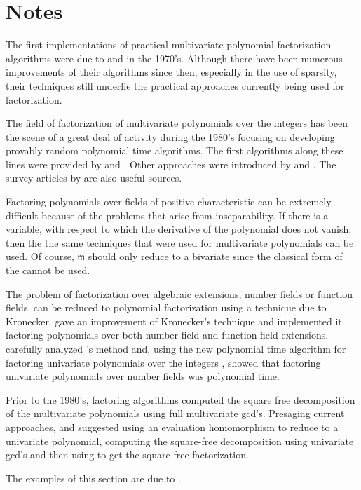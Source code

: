 \section*{Notes}

\small

The first implementations of practical multivariate polynomial
factorization algorithms were due to {\WangP} and {\Rothschild}
\cite{Wang75,Wang76a,Wang78} in the 1970's.  Although there have been
numerous improvements of their algorithms since then, especially in
the use of sparsity, their techniques still underlie the practical
approaches currently being used for factorization.

The field of factorization of multivariate polynomials over the
integers has been the scene of a great deal of activity during the
1980's focusing on developing provably random polynomial time
algorithms.  The first algorithms along these lines were provided by
{\Chistov} and {\Grigoriev} \cite{Chistov82,Chistov87}.  Other
approaches were introduced by {\Gathen} and {\Kaltofen}
\cite{Gathen83b,Gathen85a,Kaltofen85b,Kaltofen85a,Kaltofen85e,Kaltofen90a}. 
The survey articles by {\Kaltofen}
\cite{Kaltofen82c,Kaltofen90b,Kaltofen92a} are also useful
sources. 

Factoring polynomials over fields of positive characteristic can be
extremely difficult because of the problems that arise from
inseparability.  If there is a variable, with respect to which the
derivative of the polynomial does not vanish, then the the same
techniques that were used for multivariate polynomials can be used.
Of course, $\mathfrak{m}$ should only reduce to a bivariate since the
classical form of the  cannot be
used. 

The problem of factorization over algebraic extensions, number fields
or function fields, can be reduced to polynomial factorization using a
technique due to Kronecker.  {\Trager} \cite{Trager76a} gave an
improvement of Kronecker's technique and implemented it factoring
polynomials over both number field and function field extensions.
{\LandauS} \cite{Landau85a} carefully analyzed {\Trager}'s method and,
using the new polynomial time algorithm for factoring univariate
polynomials over the integers \cite{LenstraAK82}, showed that
factoring univariate polynomials over number fields was polynomial
time.

Prior to the 1980's, factoring algorithms computed the square free
decomposition of the multivariate polynomials using full multivariate
{\sc gcd}'s.  Presaging current approaches, {\Trager} and {\WangP}
\cite{Trager79} suggested using an evaluation homomorphism to reduce
to a univariate polynomial, computing the square-free decomposition
using univariate {\sc gcd}'s and then using  to
get the square-free factorization.

  The examples of this section are due
to {\Gathen} \cite{Gathen84,Gathen85a}.


\normalsize
